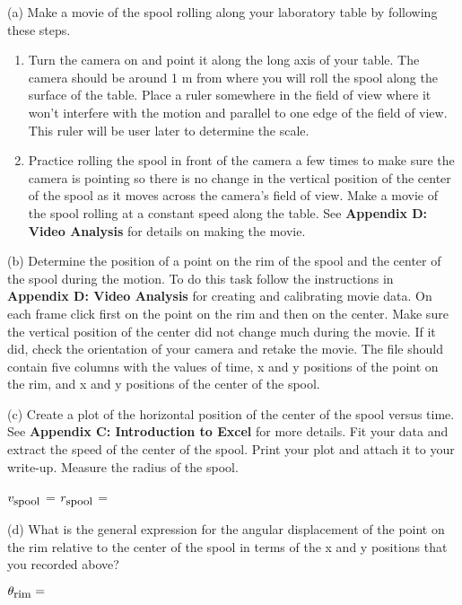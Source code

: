 (a) Make a movie of the spool rolling along your laboratory table by following
these steps. 

\begin{enumerate}
\item Turn the camera on and point it along the long axis of your table. The camera
should be around 1 m from where you will roll the spool along the surface of
the table. Place a ruler somewhere in the field of view where it won't interfere
with the motion and parallel to one edge of the field of view. This ruler will
be user later to determine the scale. 
\item Practice rolling the spool in front of the camera a few times to make sure the
camera is pointing so there is no change in the vertical position of the center
of the spool as it moves across the camera's field of view. Make a movie of
the spool rolling at a constant speed along the table. See \textbf{Appendix
D: Video Analysis} for details on making the movie.
\end{enumerate}
(b) Determine the position of a point on the rim of the spool and the center
of the spool during the motion. To do this task follow the instructions in \textbf{Appendix
D: Video Analysis} for creating and calibrating movie data. On each frame click
first on the point on the rim and then on the center. Make sure the vertical
position of the center did not change much during the movie. If it did, check
the orientation of your camera and retake the movie. The file should contain
five columns with the values of time, x and y positions of the point on the
rim, and x and y positions of the center of the spool.

(c) Create a plot of the horizontal position of the center of the spool versus
time. See \textbf{Appendix C: Introduction to Excel} for more details.
Fit your data and extract the speed of the center of the spool. Print your plot
and attach it to your write-up. Measure the radius of the spool.
\vspace{5mm}

\( v_{\mbox{\small spool}} \) = \hfill{}\( r_{\mbox{\small spool}} \) = \hfill{}
\vspace{5mm}

(d) What is the general expression for the angular displacement of the point
on the rim relative to the center of the spool in terms of the x and y positions
that you recorded above? 
\vspace{5mm}

\( \theta _{\mbox{\small rim}}= \) 
\vspace{5mm}

